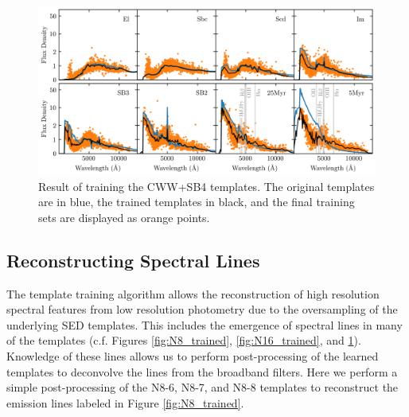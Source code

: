 \begin{figure}
    \centering
    \includegraphics{figures/cwwsb4_trained.png}
    \caption{Result of training the CWW+SB4 templates. The original templates are in blue, the trained templates in black, and the final training sets are displayed as orange points.}
    \label{fig:cwwsb4_trained}
\end{figure}



\subsection{Reconstructing Spectral Lines}
\label{sect:speclines}

The template training algorithm allows the reconstruction of high resolution spectral features from low resolution photometry due to the oversampling of the underlying SED templates.
This includes the emergence of spectral lines in many of the templates (c.f. Figures \ref{fig:N8_trained}, \ref{fig:N16_trained}, and \ref{fig:cwwsb4_trained}).
Knowledge of these lines allows us to perform post-processing of the learned templates to deconvolve the lines from the broadband filters.
Here we perform a simple post-processing of the N8-6, N8-7, and N8-8 templates to reconstruct the emission lines labeled in Figure \ref{fig:N8_trained}.

